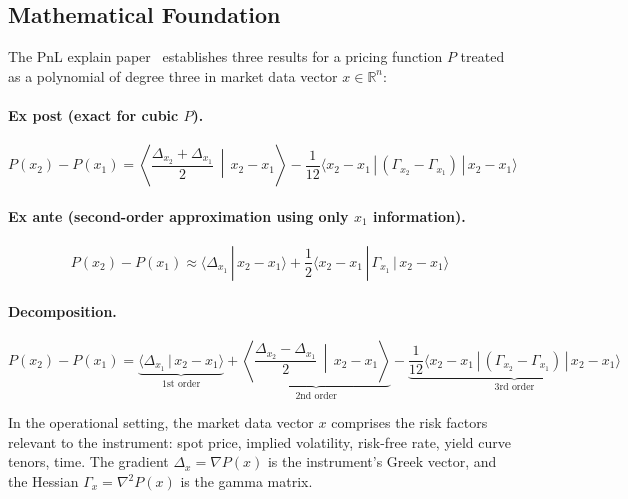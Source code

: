 \documentclass[11pt,a4paper]{article}
\begin{document}
\subsection{Mathematical Foundation}

The PnL explain paper~\cite{pnl_explain} establishes three results for a pricing function $P$ treated as a polynomial of degree three in market data vector $x \in \mathbb{R}^n$:

\paragraph{Ex post (exact for cubic $P$).}
\begin{equation}
\label{eq:pnl-expost}
P(x_2) - P(x_1) = \left\langle \frac{\Delta_{x_2} + \Delta_{x_1}}{2} \,\middle|\, x_2 - x_1 \right\rangle - \frac{1}{12}\langle x_2 - x_1 \,|\, (\Gamma_{x_2} - \Gamma_{x_1}) \,|\, x_2 - x_1 \rangle
\end{equation}

\paragraph{Ex ante (second-order approximation using only $x_1$ information).}
\begin{equation}
\label{eq:pnl-exante}
P(x_2) - P(x_1) \approx \langle \Delta_{x_1} \,|\, x_2 - x_1 \rangle + \frac{1}{2}\langle x_2 - x_1 \,|\, \Gamma_{x_1} \,|\, x_2 - x_1 \rangle
\end{equation}

\paragraph{Decomposition.}
\begin{equation}
\label{eq:pnl-decomp}
P(x_2) - P(x_1) = \underbrace{\langle \Delta_{x_1} \,|\, x_2 - x_1 \rangle}_{\text{1st order}} + \underbrace{\left\langle \frac{\Delta_{x_2} - \Delta_{x_1}}{2} \,\middle|\, x_2 - x_1 \right\rangle}_{\text{2nd order}} - \underbrace{\frac{1}{12}\langle x_2 - x_1 \,|\, (\Gamma_{x_2} - \Gamma_{x_1}) \,|\, x_2 - x_1 \rangle}_{\text{3rd order}}
\end{equation}

\noindent In the operational setting, the market data vector $x$ comprises the risk factors relevant to the instrument: spot price, implied volatility, risk-free rate, yield curve tenors, time.  The gradient $\Delta_x = \nabla P(x)$ is the instrument's Greek vector, and the Hessian $\Gamma_x = \nabla^2 P(x)$ is the gamma matrix.
\end{document}
